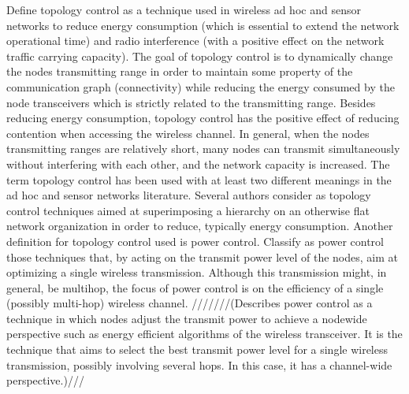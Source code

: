 Define topology control as a technique used in wireless ad hoc and sensor networks to reduce energy consumption (which is essential to extend the network operational time) and radio interference (with a positive effect on the network traffic carrying capacity). The goal of topology control is to dynamically change the nodes transmitting range in order to maintain some property of the communication graph (connectivity) while reducing the energy consumed by the node transceivers which is strictly related to the transmitting range. Besides reducing energy consumption, topology control has the positive effect of reducing contention when accessing the wireless channel. In general, when the nodes transmitting ranges are relatively short, many nodes can transmit simultaneously without interfering with each other, and the network capacity is increased.
The term topology control has been used with at least two different meanings in the ad hoc and sensor networks literature. Several authors consider as topology control techniques aimed at superimposing a hierarchy on an otherwise flat network organization in order to reduce, typically energy consumption. 
Another definition for topology control used is power control. Classify as power control those techniques that, by acting on the transmit power level of the nodes, aim at optimizing a single wireless transmission. Although this transmission might, in general, be multihop, the focus of power control is on the efficiency of a single (possibly multi-hop) wireless channel. \cite{santitopologycontrol}
///////(Describes power control as a technique in which nodes adjust the transmit power to achieve a nodewide perspective such as energy efficient algorithms of the wireless transceiver. It is the technique that aims to select the best transmit power level for a single wireless transmission, possibly involving several hops. In this case, it has a channel-wide perspective.)/// \cite{azrinasurvey}   

